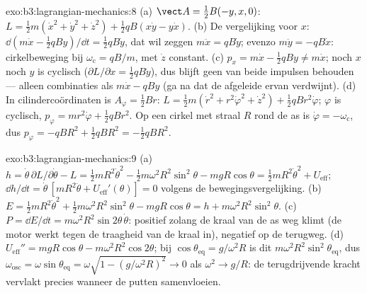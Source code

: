 \begin{solution}{exo:b3:lagrangian-mechanics:8}
(a) $\vect A = \tfrac12 B(-y, x, 0)$:
$L = \tfrac12 m(\dot x^2 + \dot y^2 + \dot z^2) + \tfrac12 qB(x\dot y -
y\dot x)$. (b) De vergelijking voor $x$: $\dd(m\dot x - \tfrac12 qBy)/\dd t =
\tfrac12 qB\dot y$, dat wil zeggen $m\ddot x = qB\dot y$; evenzo
$m\ddot y =
-qB\dot x$: cirkelbeweging bij $\omega_{\text{c}} = qB/m$,
met $\dot z$ constant. (c) $p_x = m\dot x - \tfrac12 qBy \neq m\dot x$;
noch $x$ noch $y$ is cyclisch ($\partial L/\partial x = \tfrac12 qB\dot y$), dus blijft geen van beide impulsen behouden --- alleen combinaties
als $m\dot x -
qBy$ (ga na dat de afgeleide ervan verdwijnt). (d) In
cilindercoördinaten is $A_\varphi = \tfrac12 Br$:
$L = \tfrac12 m(\dot r^2 + r^2\dot\varphi^2 + \dot z^2) + \tfrac12
qBr^2\dot\varphi$; $\varphi$ is cyclisch, $p_\varphi = mr^2\dot\varphi +
\tfrac12 qBr^2$. Op een cirkel met straal $R$ rond de as is
$\dot\varphi = -\omega_{\text{c}}$, dus $p_\varphi = -qBR^2 + \tfrac12
qBR^2 = -\tfrac12 qBR^2$.
\end{solution}

\begin{solution}{exo:b3:lagrangian-mechanics:9}
(a) $h = \dot\theta\,\partial L/\partial\dot\theta - L = \tfrac12
mR^2\dot\theta^2 - \tfrac12 m\omega^2R^2\sin^2\theta - mgR\cos\theta =
\tfrac12 mR^2\dot\theta^2 + U_{\text{eff}}$; $\dd h/\dd t =
\dot\theta\,[mR^2\ddot\theta + U_{\text{eff}}'(\theta)] = 0$ volgens de
bewegingsvergelijking. (b) $E = \tfrac12 mR^2\dot\theta^2 + \tfrac12
m\omega^2R^2\sin^2\theta - mgR\cos\theta = h +
m\omega^2R^2\sin^2\theta$. (c) $P = \dd E/\dd t =
m\omega^2R^2\sin2\theta\,\dot\theta$: positief zolang de kraal van de as
weg klimt (de motor werkt tegen de traagheid van de kraal in), negatief
op de terugweg. (d) $U_{\text{eff}}'' = mgR\cos\theta -
m\omega^2R^2\cos2\theta$; bij $\cos\theta_{\text{eq}} = g/\omega^2R$ is
dit $m\omega^2R^2\sin^2\theta_{\text{eq}}$, dus
$\omega_{\text{osc}} = \omega\sin\theta_{\text{eq}} = \omega\sqrt{1 -
(g/\omega^2R)^2} \to 0$ als $\omega^2 \to g/R$: de terugdrijvende kracht
vervlakt precies wanneer de putten samenvloeien.
\end{solution}

